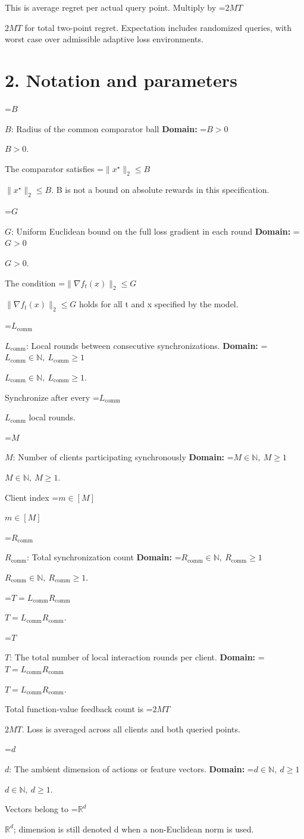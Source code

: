 \documentclass[10pt,a4paper]{article}
\newcommand{\AtlasMath}[1]{\par\begingroup\centering\setbox0=\hbox{$\displaystyle #1$}\ifdim\wd0>1.4\linewidth\typeout{ATLAS WIDE FORMULA: \the\wd0}\fi\ifdim\wd0>\linewidth\resizebox{\linewidth}{!}{\box0}\else\box0\fi\par\endgroup}
\newcommand{\AtlasInlineMath}[1]{\begingroup\setbox0=\hbox{$#1$}\ifdim\wd0>.4\linewidth\endgroup\AtlasMath{#1}\else\endgroup$#1$\fi}
\begin{document}
This is average regret per actual query point. Multiply by \AtlasInlineMath{2MT} for total two-point regret. Expectation includes randomized queries, with worst case over admissible adaptive loss environments.

\section{2. Notation and parameters}
\AtlasInlineMath{B}: Radius of the common comparator ball \textbf{Domain:} \AtlasInlineMath{B>0}.

The comparator satisfies \AtlasInlineMath{\|x^\star\|_2\le B}. B is not a bound on absolute rewards in this specification.

\AtlasInlineMath{G}: Uniform Euclidean bound on the full loss gradient in each round \textbf{Domain:} \AtlasInlineMath{G>0}.

The condition \AtlasInlineMath{\|\nabla f_t(x)\|_2\le G} holds for all t and x specified by the model.

\AtlasInlineMath{L_{\mathrm{comm}}}: Local rounds between consecutive synchronizations. \textbf{Domain:} \AtlasInlineMath{L_{\mathrm{comm}}\in\mathbb N,\ L_{\mathrm{comm}}\ge1}.

Synchronize after every \AtlasInlineMath{L_{\mathrm{comm}}} local rounds.

\AtlasInlineMath{M}: Number of clients participating synchronously \textbf{Domain:} \AtlasInlineMath{M\in\mathbb N,\ M\ge1}.

Client index \AtlasInlineMath{m\in[M]}

\AtlasInlineMath{R_{\mathrm{comm}}}: Total synchronization count \textbf{Domain:} \AtlasInlineMath{R_{\mathrm{comm}}\in\mathbb N,\ R_{\mathrm{comm}}\ge1}.

\AtlasInlineMath{T=L_{\mathrm{comm}}R_{\mathrm{comm}}}.

\AtlasInlineMath{T}: The total number of local interaction rounds per client. \textbf{Domain:} \AtlasInlineMath{T=L_{\mathrm{comm}}R_{\mathrm{comm}}}.

Total function-value feedback count is \AtlasInlineMath{2MT}. Loss is averaged across all clients and both queried points.

\AtlasInlineMath{d}: The ambient dimension of actions or feature vectors. \textbf{Domain:} \AtlasInlineMath{d\in\mathbb N,\ d\ge1}.

Vectors belong to \AtlasInlineMath{\mathbb R^d}; dimension is still denoted d when a non-Euclidean norm is used.
\end{document}
